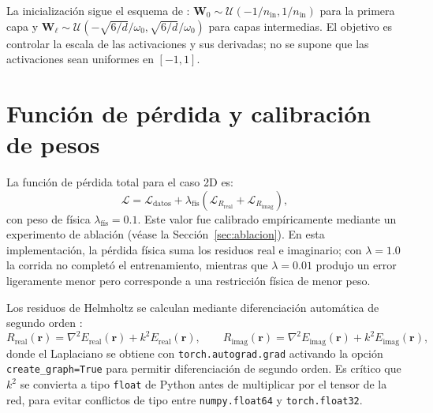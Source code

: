 La inicialización sigue el esquema de \textcite{sitzmann2020siren}:
$\mathbf{W}_0 \sim \mathcal{U}(-1/n_\text{in}, 1/n_\text{in})$ para la primera
capa y $\mathbf{W}_\ell \sim \mathcal{U}(-\sqrt{6/d}/\omega_0,
\sqrt{6/d}/\omega_0)$ para capas intermedias. El objetivo es controlar la
escala de las activaciones y sus derivadas; no se supone que las activaciones
sean uniformes en $[-1,1]$.

\section{Función de pérdida y calibración de pesos}

La función de pérdida total para el caso 2D es:
%
\begin{equation}
    \mathcal{L} = \mathcal{L}_\text{datos}
    + \lambda_\text{fís}\!\left(
    \mathcal{L}_{R_\text{real}} + \mathcal{L}_{R_\text{imag}}
    \right),
    \label{eq:loss_2d}
\end{equation}
%
con peso de física $\lambda_\text{fís} = 0.1$. Este valor fue calibrado
empíricamente mediante un experimento de ablación (véase la
Sección~\ref{sec:ablacion}). En esta implementación, la pérdida física suma
los residuos real e imaginario; con $\lambda = 1.0$ la corrida no completó el
entrenamiento, mientras que $\lambda = 0.01$ produjo un error ligeramente
menor pero corresponde a una restricción física de menor peso.

Los residuos de Helmholtz se calculan mediante diferenciación automática de
segundo orden \parencite{baydin2018autodiff}:
%
\begin{equation}
    R_\text{real}(\mathbf{r}) = \nabla^2 E_\text{real}(\mathbf{r})
    + k^2 E_\text{real}(\mathbf{r}), \qquad
    R_\text{imag}(\mathbf{r}) = \nabla^2 E_\text{imag}(\mathbf{r})
    + k^2 E_\text{imag}(\mathbf{r}),
\end{equation}
%
donde el Laplaciano se obtiene con \texttt{torch.autograd.grad} activando la
opción \texttt{create\_graph=True} para permitir diferenciación de segundo orden.
Es crítico que $k^2$ se convierta a tipo \texttt{float} de Python antes de
multiplicar por el tensor de la red, para evitar conflictos de tipo entre
\texttt{numpy.float64} y \texttt{torch.float32}.

